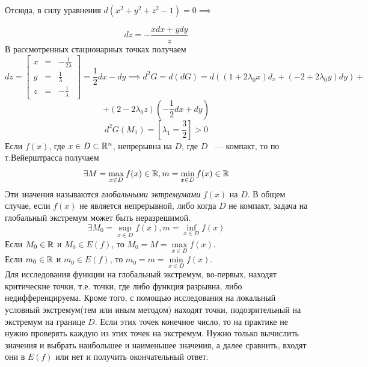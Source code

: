 \documentclass[../../main.tex]{subfiles}
\begin{document}
	Отсюда, в силу 	уравнения $d\left( x^2 + y^2 + z^2 - 1 
	\right) = 0 \implies$
	
	\[ dz = - \frac{xdx + ydy}{z}\]
	В рассмотренных стационарных точках получаем
	\[ dz = \left[
	\begin{array}{ccc}
	x & = & -\frac{1}{2\lambda} \\
	y & = & \frac{1}{\lambda} \\
	z & = & -\frac{1}{\lambda}
	\end{array}
	\right] = \frac{1}{2}dx - dy \implies d^2G = d\left(dG\right) = 
	d\left(\left(1 + 2\lambda_0x\right)d_x + \left(-2 
	+ 2\lambda_0y\right)dy\right) +\] 
	\[ + \left(2 - 2\lambda_0z\right)\left(-\frac{1}{2}dx + dy\right) \] 
	\[d^2G(M_1) = \left[\lambda_1 = \frac{3}{2}\right] > 0\]
	Если $f\left(x\right)$, где $x \in D \subset \mathbb{R}^n$, непрерывна на $D$,
	где $D$ ~--- компакт, то по т.Вейерштрасса получаем
	\[ \exists M = \max\limits_{x \in D} f(x) \in \mathbb{R},
	m = \min\limits_{x \in D} f(x) \in \mathbb{R} \]
	Эти значения называются \emph{глобальными эктремумами} $f(x)$ на $D$.
	В общем случае, если $f(x)$ не является непрерывной, либо когда $D$ 
	не компакт, задача на глобальный экстремум может быть неразрешимой.
	\[ \exists M_0 = \sup\limits_{x \in D} f(x),
	m = \inf\limits_{x \in D} f(x) \]
	Если $M_0 \in \mathbb{R}$ и $M_0 \in E(f)$, то $M_0 = M = 
	\max\limits_{x \in D} f(x)$. \\
	Если $m_0 \in \mathbb{R}$ и $m_0 \in E(f)$, то $m_0 = m = 
	\min\limits_{x \in D} f(x)$. \\
	Для исследования функции на глобальный экстремум, во-первых, 
	находят критические точки, т.е. точки, 
	где либо функция разрывна, либо недифференцируема. Кроме того, с помощью 
	исследования на локальный условный экстремум(тем или иным методом)
	находят точки, подозрительный на экстремум на границе $D$.
	Если этих точек конечное число, то на практике не нужно проверять каждую из 
	этих точек на экстремум.
	Нужно только вычислить значения и выбрать наибольшее и наименьшее значения, 
	а далее сравнить, входят они в $E(f)$ или нет и 
	получить окончательный ответ.\\
	
\end{document}
